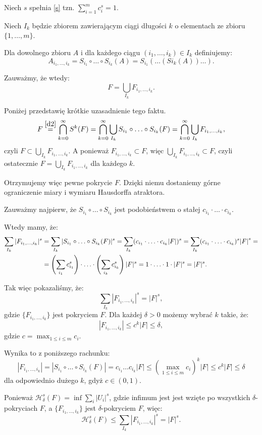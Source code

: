 \documentclass{mini}
\begin{document}
\begin{dow}

Niech $s$ spełnia \eqref{s} tzn. $\sum^m_{i=1}c_i^s=1$. 

Niech $I_k$ będzie zbiorem zawierającym ciągi długości $k$ o elementach ze zbioru $\lbrace 1,\ldots,m\rbrace$.

Dla dowolnego zbioru $A$ i dla każdego ciągu $(i_1,\ldots,i_k)\in I_k$ definiujemy:
$$
A_{i_1,\ldots,i_k}=S_{i_1}\circ\ldots\circ S_{i_k}(A)=S_{i_1}(\ldots(S{i_k}(A))\ldots).
$$

Zauważmy, że wtedy:  
$$
F=\bigcup_{I_k}F_{i_1,\ldots,i_k}.
$$ 

Poniżej przedstawię krótkie uzasadnienie tego faktu.
$$
F\stackrel{\eqref{d2}}{=}\bigcap^{\infty}_{k=0}S^k(F)=\bigcap^{\infty}_{k=0}\bigcup_{I_k} S_{i_1}\circ\ldots\circ S_{i_k}(F)=\bigcap^{\infty}_{k=0}\bigcup_{I_k}F_{i_1,\ldots,i_k},
$$
czyli $F\subset\bigcup_{I_k}F_{i_1,\ldots,i_k}$. A ponieważ $F_{i_1,\ldots,i_k}\subset F$, więc $\bigcup_{I_k}F_{i_1,\ldots,i_k}\subset F$, czyli ostatecznie $F=\bigcup_{I_k}F_{i_1,\ldots,i_k}$ dla każdego $k$.

Otrzymujemy więc pewne pokrycie $F$. Dzięki niemu dostaniemy górne ograniczenie miary i wymiaru Hausdorffa atraktora. 

Zauważmy najpierw, że $S_{i_1}\circ\ldots\circ S_{i_k}$ jest podobieństwem o stałej $c_{i_1}\cdot\ldots\cdot c_{i_k}$.

Wtedy mamy, że:
$$
\aligned
\sum_{I_k}|F_{i_1,\ldots,i_k}|^s&=\sum_{I_k}|S_{i_1}\circ\ldots\circ S_{i_k}(F)|^s=\sum_{I_k}(c_{i_1}\cdot\ldots\cdot c_{i_k}|F|)^s= \sum_{I_k}(c_{i_1}\cdot\ldots\cdot c_{i_k})^s{|F|}^s = \\
&=\left(\sum_{i_1}c_{i_1}^s\right)\cdot \ldots\cdot\left(\sum_{i_k}c_{i_k}^s\right)|F|^s=1\cdot\ldots\cdot1\cdot|F|^s=|F|^s.
\endaligned
$$

Tak więc pokazaliśmy, że:
$$
\sum_{I_k}|F_{i_1,\ldots,i_k}|^s=|F|^s,
$$
gdzie $\lbrace F_{i_1,\ldots,i_k}\rbrace$ jest pokryciem $F$. Dla każdej $\delta>0$ możemy wybrać $k$ takie, że: 
$$
|F_{i_1,\ldots,i_k}|\leqslant c^k|F|\leqslant\delta,
$$
gdzie $c=\max_{1\leqslant i\leqslant m}{c_i}$.

Wynika to z poniższego rachunku:
$$
|F_{i_1,\ldots,i_k}|=|S_{i_1}\circ\ldots\circ S_{i_k}(F)|=c_{i_1}\ldots c_{i_k}|F| \leqslant \left(\max_{1\leqslant i\leqslant m}{c_i}\right)^k|F|\leqslant c^k|F|\leqslant\delta
$$ 
dla odpowiednio dużego $k$, gdyż $c \in (0,1)$.

Ponieważ $\mathcal{H}^s_{\delta}(F)=\inf\sum_i|U_i|^s$, gdzie infimum jest jest wzięte po wszystkich $\delta$-pokryciach $F$, a $\lbrace F_{i_1,\ldots,i_k}\rbrace$ jest $\delta$-pokryciem $F$, więc:
$$
\mathcal{H}^s_{\delta}(F)\leqslant \sum_{I_k}|F_{i_1,\ldots,i_k}|^s=|F|^s.
$$


\end{dow}
\end{document}

